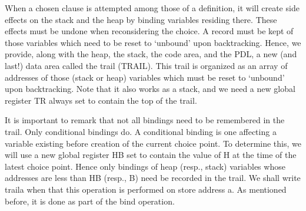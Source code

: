 
When a chosen clause is attempted among those of a definition, it will create
side effects on the stack and the heap by binding variables residing there. These
effects must be undone when reconsidering the choice. A record must be kept of
those variables which need to be reset to ‘unbound’ upon backtracking. Hence,
we provide, along with the heap, the stack, the code area, and the PDL, a new
(and last!) data area called the trail (TRAIL). This trail is organized as an array
of addresses of those (stack or heap) variables which must be reset to ‘unbound’
upon backtracking. Note that it also works as a stack, and we need a new global
register TR always set to contain the top of the trail.

It is important to remark that not all bindings need to be remembered in the trail.
Only conditional bindings do. A conditional binding is one affecting a variable
existing before creation of the current choice point. To determine this, we will use
a new global register HB set to contain the value of H at the time of the latest choice
point. Hence only bindings of heap (resp., stack) variables whose addresses
are less than HB (resp., B) need be recorded in the trail. We shall write traila
when
that this operation is performed on store address a. As mentioned before, it is
done as part of the bind operation.

